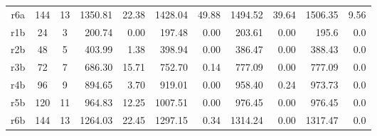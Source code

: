 \begin{landscape}
\begin{table}[]
\begin{tabular}{cllrrrrrrrr}
  r6a                  & \multicolumn{1}{c}{144}  & \multicolumn{1}{c}{13}   & 1350.81                       & 22.38                         & 1428.04                        & 49.88                        & 1494.52                        & 39.64                         & 1506.35                        & 9.56                         \\
  r1b                  & \multicolumn{1}{c}{24}  & \multicolumn{1}{c}{3}   & 200.74                       & 0.00                      & 197.48                       & 0.00                        & 203.61                        & 0.00                       & 195.6                        & 0.0
                           \\
  r2b                  & \multicolumn{1}{c}{48}  & \multicolumn{1}{c}{5}   & 403.99                        & 1.38                         & 398.94                        & 0.00                        & 386.47                        & 0.00                        & 388.43                        & 0.0                         \\
  r3b                  & \multicolumn{1}{c}{72}  & \multicolumn{1}{c}{7}   & 686.30                & 15.71                        & 752.70                        & 0.14                         & 777.09                        & 0.00                        & 777.09                        & 0.0                         \\
  r4b                  & \multicolumn{1}{c}{96}  & \multicolumn{1}{c}{9}   & 894.65                     & 3.70                    & 919.01                        & 0.00                        & 958.40                        & 0.24                         & 973.73                        & 0.0                         \\
  r5b                  & \multicolumn{1}{c}{120}  & \multicolumn{1}{c}{11}   & 964.83                      & 12.25                         & 1007.51                        & 0.00                       & 976.45                        & 0.00                        & 976.45                       & 0.0                         \\
  r6b                  & \multicolumn{1}{c}{144}  & \multicolumn{1}{c}{13}   & 1264.03                     & 22.45                        & 1297.15                       & 0.34                         & 1314.24                        & 0.00                        & 1317.47                        & 0.0                         \\\hline
  \end{tabular}
  \end{table}
\end{landscape}




